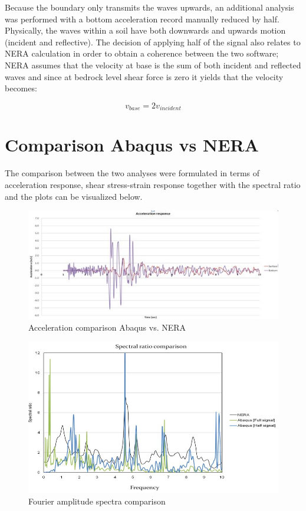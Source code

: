 	Because the boundary only transmits the waves upwards, an additional analysis was performed with a bottom acceleration record manually reduced by half. Physically, the waves within a soil have both downwards and upwards motion (incident and reflective). The decision of applying half of the signal also relates to NERA calculation in order to obtain a coherence between the two software; NERA assumes that the velocity at base is the sum of both incident and reflected waves and since at bedrock level shear force is zero it yields that the velocity becomes:
	
	\begin{equation}
	v_{base}=2v_{incident}
	\end{equation} 
	
	\section{Comparison Abaqus vs NERA}
	The comparison between the two analyses were formulated in terms of acceleration response, shear stress-strain response together with the spectral ratio and the plots can be visualized below. 
	
	\begin{figure}[h!]
		\centering
		\includegraphics[width=0.7\linewidth]{"acc_response2"}
		\caption{Acceleration comparison Abaqus vs. NERA}
		\label{comp1}
	\end{figure}
	
	\begin{figure}[h!]
		\centering
		\includegraphics[width=0.7\linewidth]{"spectral2"}
		\caption{Fourier amplitude spectra comparison}
		\label{fourier2}
	\end{figure}
	
